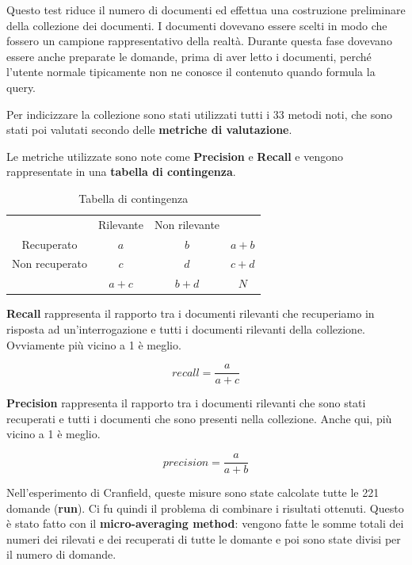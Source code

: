 Questo test riduce il numero di documenti ed effettua una costruzione preliminare della collezione dei documenti. I documenti dovevano essere scelti in modo che fossero un campione rappresentativo della realtà. Durante questa fase dovevano essere anche preparate le domande, prima di aver letto i documenti, perché l'utente normale tipicamente non ne conosce il contenuto quando formula la query.

Per indicizzare la collezione sono stati utilizzati tutti i 33 metodi noti, che sono stati poi valutati secondo delle \textbf{metriche di valutazione}.

Le metriche utilizzate sono note come \textbf{Precision} e \textbf{Recall} e vengono rappresentate in una \textbf{tabella di contingenza}.

\begin{table}[htbp]
	\centering	
	\begin{tabular}{cccc}
		\cline{2-3}
		\multicolumn{1}{c|}{}                & \multicolumn{1}{c|}{Rilevante} & \multicolumn{1}{c|}{Non rilevante} &     \\ \cline{1-3}
		\multicolumn{1}{|c|}{Recuperato}     & \multicolumn{1}{c|}{$a$}         & \multicolumn{1}{c|}{$b$}             & $a+b$ \\ \cline{1-3}
		\multicolumn{1}{|c|}{Non recuperato} & \multicolumn{1}{c|}{$c$}         & \multicolumn{1}{c|}{$d$}             & $c+d$ \\ \cline{1-3}
		& $a+c$                            & $b+d$                                & $N$  
	\end{tabular}
	\caption{Tabella di contingenza}
\end{table}

\noindent \textbf{Recall} rappresenta il rapporto tra i documenti rilevanti che recuperiamo in risposta ad un'interrogazione e tutti i documenti rilevanti della collezione. Ovviamente più vicino a 1 è meglio.

$$
recall = \frac{a}{a+c}
$$

\noindent \textbf{Precision} rappresenta il rapporto tra i documenti rilevanti che sono stati recuperati e tutti i documenti che sono presenti nella collezione. Anche qui, più vicino a 1 è meglio.

$$
precision = \frac{a}{a+b}
$$

Nell'esperimento di Cranfield, queste misure sono state calcolate tutte le 221 domande (\textbf{run}).
Ci fu quindi il problema di combinare i risultati ottenuti. Questo è stato fatto con il \textbf{micro-averaging method}: vengono fatte le somme totali dei numeri dei rilevati e dei recuperati di tutte le domante e poi sono state divisi per il numero di domande.

